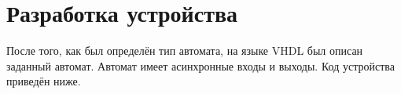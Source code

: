 \documentclass[a4paper, 14pt]{article}
\begin{document}
    \section{Разработка устройства}
    После того, как был определён тип автомата, на языке VHDL был описан заданный автомат.
    Автомат имеет асинхронные входы и выходы. Код устройства приведён ниже.
\end{document}
